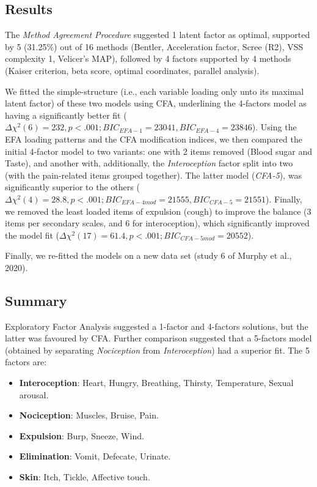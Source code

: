 \documentclass[
  man,floatsintext]{apa6}
\providecommand{\tightlist}{%
  \setlength{\itemsep}{0pt}\setlength{\parskip}{0pt}}
\begin{document}
\hypertarget{results}{%
\subsection{Results}\label{results}}

The \emph{Method Agreement Procedure} suggested 1 latent factor as optimal, supported by 5 (31.25\%) out of 16 methods (Bentler, Acceleration factor, Scree (R2), VSS complexity 1, Velicer's MAP), followed by 4 factors supported by 4 methods (Kaiser criterion, beta score, optimal coordinates, parallel analysis).

We fitted the simple-structure (i.e., each variable loading only unto its maximal latent factor) of these two models using CFA, underlining the 4-factors model as having a significantly better fit (\(\Delta \chi^2(6) = 232, p < .001; BIC_{EFA-1} = 23041, BIC_{EFA-4} = 23846\)). Using the EFA loading patterns and the CFA modification indices, we then compared the initial 4-factor model to two variants: one with 2 items removed (Blood sugar and Taste), and another with, additionally, the \emph{Interoception} factor split into two (with the pain-related items grouped together). The latter model (\emph{CFA-5}), was significantly superior to the others (\(\Delta \chi^2(4) = 28.8, p < .001; BIC_{EFA-4mod} = 21555, BIC_{CFA-5} = 21551\)). Finally, we removed the least loaded items of expulsion (cough) to improve the balance (3 items per secondary scales, and 6 for interoception), which significantly improved the model fit (\(\Delta \chi^2(17) = 61.4, p < .001; BIC_{CFA-5mod} = 20552\)).

Finally, we re-fitted the models on a new data set (study 6 of Murphy et al., 2020).

\hypertarget{summary}{%
\subsection{Summary}\label{summary}}

Exploratory Factor Analysis suggested a 1-factor and 4-factors solutions, but the latter was favoured by CFA. Further comparison suggested that a 5-factors model (obtained by separating \emph{Nociception} from \emph{Interoception}) had a superior fit. The 5 factors are:

\begin{itemize}
\tightlist
\item
  \textbf{Interoception}: Heart, Hungry, Breathing, Thirsty, Temperature, Sexual arousal.
\item
  \textbf{Nociception}: Muscles, Bruise, Pain.
\item
  \textbf{Expulsion}: Burp, Sneeze, Wind.
\item
  \textbf{Elimination}: Vomit, Defecate, Urinate.
\item
  \textbf{Skin}: Itch, Tickle, Affective touch.
\end{itemize}
\end{document}
